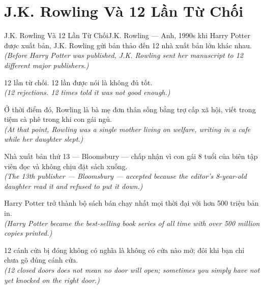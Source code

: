 \section{J.K. Rowling Và 12 Lần Từ Chối}
\begin{truyen}{J.K. Rowling Và 12 Lần Từ Chối}{J.K. Rowling --- Anh, 1990s}
 khi Harry Potter được xuất bản, J.K. Rowling gửi bản thảo đến 12 nhà xuất bản lớn khác nhau.\\[4pt]
\textit{(Before Harry Potter was published, J.K. Rowling sent her manuscript to 12 different major publishers.)}

12 lần từ chối. 12 lần được nói là không đủ tốt.\\[4pt]
\textit{(12 rejections. 12 times told it was not good enough.)}

Ở thời điểm đó, Rowling là bà mẹ đơn thân sống bằng trợ cấp xã hội, viết trong tiệm cà phê trong khi con gái ngủ.\\[4pt]
\textit{(At that point, Rowling was a single mother living on welfare, writing in a cafe while her daughter slept.)}

Nhà xuất bản thứ 13 --- Bloomsbury --- chấp nhận vì con gái 8 tuổi của biên tập viên đọc và không chịu đặt sách xuống.\\[4pt]
\textit{(The 13th publisher --- Bloomsbury --- accepted because the editor's 8-year-old daughter read it and refused to put it down.)}

Harry Potter trở thành bộ sách bán chạy nhất mọi thời đại với hơn 500 triệu bản in.\\[4pt]
\textit{(Harry Potter became the best-selling book series of all time with over 500 million copies printed.)}

\end{truyen}
\begin{baihoc}
  12 cánh cửa bị đóng không có nghĩa là không có cửa nào mở; đôi khi bạn chỉ chưa gõ đúng cánh cửa.\\[4pt]
  \textit{(12 closed doors does not mean no door will open; sometimes you simply have not yet knocked on the right door.)}
\end{baihoc}

